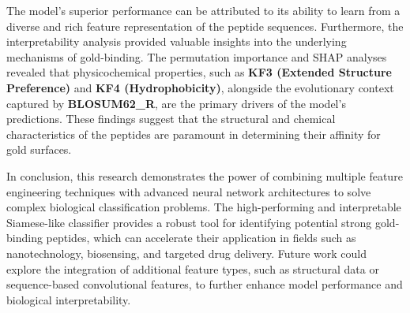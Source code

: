 \documentclass{article}
\begin{document}
The model's superior performance can be attributed to its ability to learn from a diverse and rich feature representation of the peptide sequences. Furthermore, the interpretability analysis provided valuable insights into the underlying mechanisms of gold-binding. The permutation importance and SHAP analyses revealed that physicochemical properties, such as \textbf{KF3 (Extended Structure Preference)} and \textbf{KF4 (Hydrophobicity)}, alongside the evolutionary context captured by \textbf{BLOSUM62\_R}, are the primary drivers of the model's predictions. These findings suggest that the structural and chemical characteristics of the peptides are paramount in determining their affinity for gold surfaces.

In conclusion, this research demonstrates the power of combining multiple feature engineering techniques with advanced neural network architectures to solve complex biological classification problems. The high-performing and interpretable Siamese-like classifier provides a robust tool for identifying potential strong gold-binding peptides, which can accelerate their application in fields such as nanotechnology, biosensing, and targeted drug delivery. Future work could explore the integration of additional feature types, such as structural data or sequence-based convolutional features, to further enhance model performance and biological interpretability.
\end{document}
